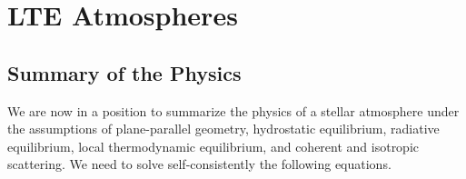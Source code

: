 
\chapter{LTE Atmospheres}

\section{Summary of the Physics}

We are now in a position to summarize the physics of a stellar atmosphere under the assumptions of plane-parallel geometry, hydrostatic equilibrium, radiative equilibrium, local thermodynamic equilibrium, and coherent and isotropic scattering. We need to solve self-consistently the following equations. 

\newslide

